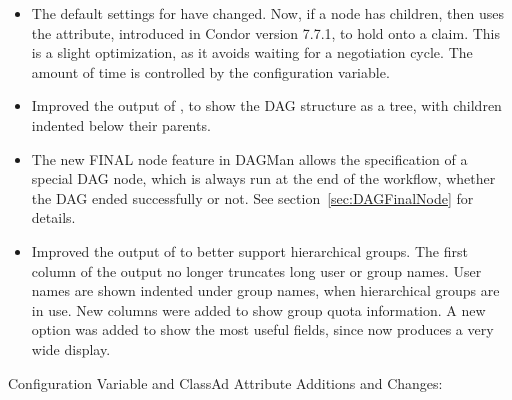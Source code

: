 \begin{itemize}
\item The default settings for  have changed.
Now, if a node has children, then  uses the
 attribute, 
introduced in Condor version 7.7.1, to hold onto a claim.
This is a slight optimization, 
as it avoids waiting for a negotiation cycle.
The amount of time is controlled by the
 configuration variable.

\item Improved the output of  ,
to show the DAG structure as a tree,
with children indented below their parents.

\item The new FINAL node feature in DAGMan allows the specification
of a special DAG node, 
which is always run at the end of the workflow,
whether the DAG ended successfully or not.
See section~\ref{sec:DAGFinalNode} for details.

\item Improved the output of  to better support hierarchical
groups. 
The first column of the output no longer truncates long user or group names.
User names are shown indented under group names,
when hierarchical groups are in use.
New columns were added to show group quota information.
A new  option was added to show 
the most useful fields,
since  now produces a very wide display.

\end{itemize}

\noindent Configuration Variable and ClassAd Attribute Additions and Changes:

